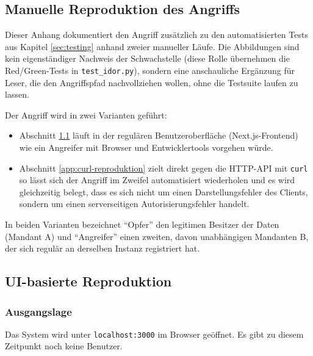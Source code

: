 \begin{appendix} %
    \section{Manuelle Reproduktion des Angriffs}
    \label{app:reproduktion}

    Dieser Anhang dokumentiert den Angriff zusätzlich zu den automatisierten
    Tests aus Kapitel \ref{sec:testing} anhand zweier manueller Läufe. Die
    Abbildungen sind kein eigenständiger Nachweis der Schwachstelle
    (diese Rolle übernehmen die Red/Green-Tests in \texttt{test\_idor.py}),
    sondern eine anschauliche Ergänzung für Leser, die den Angriffspfad
    nachvollziehen wollen, ohne die Testsuite laufen zu lassen.

    Der Angriff wird in zwei Varianten geführt:
    \begin{itemize}
        \item Abschnitt \ref{app:ui-reproduktion} läuft in der regulären
              Benutzeroberfläche (Next.js-Frontend) \textemdash{} wie ein
              Angreifer mit Browser und Entwicklertools vorgehen würde.
        \item Abschnitt \ref{app:curl-reproduktion} zielt direkt gegen
              die HTTP-API mit \texttt{curl} \textemdash{} so lässt sich
              der Angriff im Zweifel automatisiert wiederholen und es
              wird gleichzeitig belegt, dass es sich nicht um einen
              Darstellungsfehler des Clients, sondern um einen
              serverseitigen Autorisierungsfehler handelt.
    \end{itemize}

    In beiden Varianten bezeichnet \enquote{Opfer} den legitimen Besitzer
    der Daten (Mandant A) und \enquote{Angreifer} einen zweiten, davon
    unabhängigen Mandanten B, der sich regulär an derselben Instanz
    registriert hat.

    \subsection{UI-basierte Reproduktion}
    \label{app:ui-reproduktion}

    \subsubsection{Ausgangslage}

    Das System wird unter \texttt{localhost:3000} im Browser geöffnet. Es
    gibt zu diesem Zeitpunkt noch keine Benutzer.


\end{appendix}

